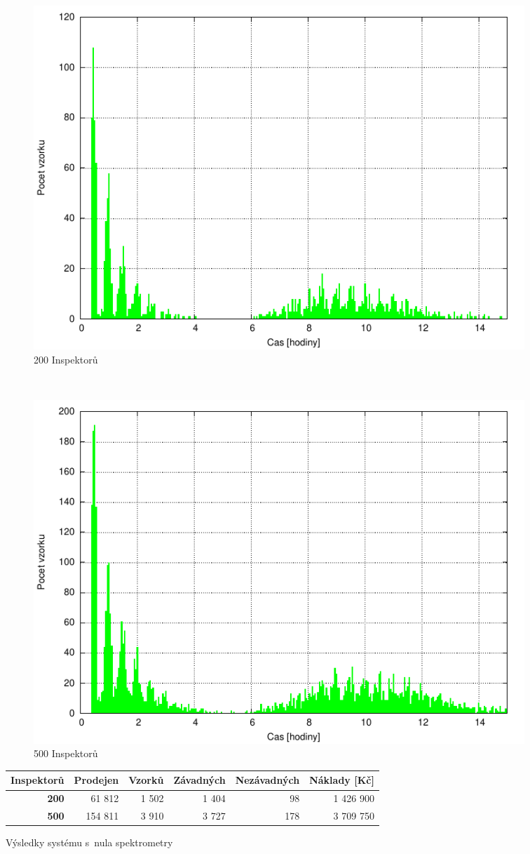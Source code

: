 \documentclass[11pt,a4paper]{article}
\begin{document}
\begin{figure}[h!]
  \centering
  \begin{subfigure}[t]{0.5\textwidth}
    \centering
    \includegraphics[width=\textwidth]{exp1_200}
    \caption{200 Inspektorů}
    \label{zeroa}
  \end{subfigure}~\begin{subfigure}[t]{0.5\textwidth}
    \centering
    \includegraphics[width=\textwidth]{exp1_500}
    \caption{500 Inspektorů}
    \label{zerob}
  \end{subfigure}
  \begin{tabular}{|r|r|r|r|r|r|}  \hline
        \textbf{Inspektorů}&\textbf{Prodejen} & \textbf{Vzorků} & \textbf{Závadných}   
        & \textbf{Nezávadných} & \textbf{Náklady [Kč]} \\\hline
        \textbf{200}&61 812&1 502&1 404&98&1 426 900         \\\hline
        \textbf{500}&154 811&3 910&3 727&178&3 709 750         \\\hline
      \end{tabular}
  \caption{Výsledky systému s~nula spektrometry}
\end{figure} 
\end{document}
